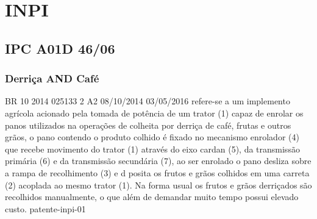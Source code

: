 
\chapter{INPI}
\label{chap:inpi}

\section{IPC A01D 46/06}
\label{sec:ipc-a01d-4606}

\subsection{Derriça AND Café}
\label{sec:derrica-cafe}

{BR 10 2014 025133 2 A2}%
{08/10/2014}%
{03/05/2016}%
{refere-se a um implemento agrícola acionado pela tomada de potência de um
  trator (1) capaz de enrolar os panos utilizados na operações de colheita por
  derriça de café, frutas e outros grãos, o pano contendo o produto colhido é
  fixado no mecanismo enrolador (4) que recebe movimento do trator (1) através
  do eixo cardan (5), da transmissão primária (6) e da transmissão secundária
  (7), ao ser enrolado o pano desliza sobre a rampa de recolhimento (3) e d
  posita os frutos e grãos colhidos em uma carreta (2) acoplada ao mesmo trator
  (1). Na forma usual os frutos e grãos derriçados são recolhidos manualmente, o
  que além de demandar muito tempo possui elevado custo.}%
{patente-inpi-01}%

